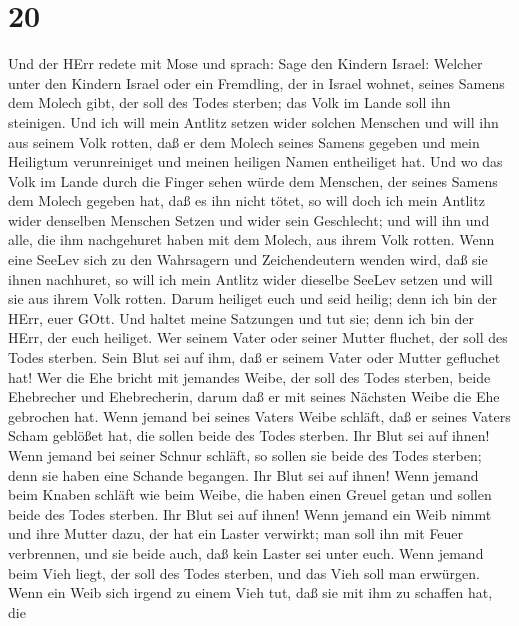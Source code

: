 \hypertarget{section-19}{%
\section{20}\label{section-19}}

 Und der HErr redete mit Mose und sprach:  Sage
den Kindern Israel: Welcher unter den Kindern Israel oder ein Fremdling,
der in Israel wohnet, seines Samens dem Molech gibt, der soll des Todes
sterben; das Volk im Lande soll ihn steinigen.  Und ich will
mein Antlitz setzen wider solchen Menschen und will ihn aus seinem Volk
rotten, daß er dem Molech seines Samens gegeben und mein Heiligtum
verunreiniget und meinen heiligen Namen entheiliget hat. 
Und wo das Volk im Lande durch die Finger sehen würde dem Menschen, der
seines Samens dem Molech gegeben hat, daß es ihn nicht tötet,
 so will doch ich mein Antlitz wider denselben Menschen
Setzen und wider sein Geschlecht; und will ihn und alle, die ihm
nachgehuret haben mit dem Molech, aus ihrem Volk rotten. 
Wenn eine SeeLev sich zu den Wahrsagern und Zeichendeutern wenden wird,
daß sie ihnen nachhuret, so will ich mein Antlitz wider dieselbe SeeLev
setzen und will sie aus ihrem Volk rotten.  Darum heiliget
euch und seid heilig; denn ich bin der HErr, euer GOtt.  Und
haltet meine Satzungen und tut sie; denn ich bin der HErr, der euch
heiliget.  Wer seinem Vater oder seiner Mutter fluchet, der
soll des Todes sterben. Sein Blut sei auf ihm, daß er seinem Vater oder
Mutter gefluchet hat!  Wer die Ehe bricht mit jemandes
Weibe, der soll des Todes sterben, beide Ehebrecher und Ehebrecherin,
darum daß er mit seines Nächsten Weibe die Ehe gebrochen hat.
 Wenn jemand bei seines Vaters Weibe schläft, daß er seines
Vaters Scham geblößet hat, die sollen beide des Todes sterben. Ihr Blut
sei auf ihnen!  Wenn jemand bei seiner Schnur schläft, so
sollen sie beide des Todes sterben; denn sie haben eine Schande
begangen. Ihr Blut sei auf ihnen!  Wenn jemand beim Knaben
schläft wie beim Weibe, die haben einen Greuel getan und sollen beide
des Todes sterben. Ihr Blut sei auf ihnen!  Wenn jemand ein
Weib nimmt und ihre Mutter dazu, der hat ein Laster verwirkt; man soll
ihn mit Feuer verbrennen, und sie beide auch, daß kein Laster sei unter
euch.  Wenn jemand beim Vieh liegt, der soll des Todes
sterben, und das Vieh soll man erwürgen.  Wenn ein Weib
sich irgend zu einem Vieh tut, daß sie mit ihm zu schaffen hat, die

